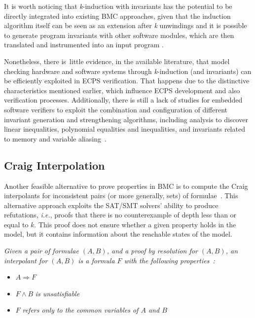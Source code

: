 \documentclass[format=acmsmall, review=false, screen=true]{acmart}
\begin{document}
It is worth noticing that \textit{k}-induction with invariants has the potential to be directly integrated into existing BMC approaches, given that the induction algorithm itself can be seen as an extension after \textit{k} unwindings and it is possible to generate program invariants with other software modules, which are then translated and instrumented into an input program \cite{Rocha15}.

Nonetheless, there is~little evidence, in the available literature, that model checking hardware and software systems through \textit{k}-induction (and invariants) can be efficiently exploited in ECPS verification. That happens due to the distinctive characteristics mentioned earlier, which influence ECPS development and also verification processes. Additionally, there is still a lack of studies for embedded software verifiers to exploit the combination and configuration of different invariant generation and strengthening algorithms, including analysis to discover linear inequalities, polynomial equalities and inequalities, and invariants related to memory and variable aliasing~\cite{Bradley07}.

\subsection{Craig Interpolation}
\label{sec:CraigInterpolationInModelChecking}

Another feasible alternative to prove properties in BMC is to compute the Craig interpolants for inconsistent pairs (or more generally, sets) of formulae~\cite{McMillan03,McMillan05,McMillan06,McMillan07}. This alternative approach exploits the SAT/SMT solvers' ability to produce refutations, {\it i.e.}, proofs that there is no counterexample of depth less than or equal to $k$. This proof does not ensure whether a given property holds in the model, but it contains information about the reachable states of the model.

\begin{definition}\label{interpolants}
\textit{Given a pair of formulae $\left(A,B\right)$, and a proof by resolution for $\left(A,B\right)$, an \textit{interpolant} for $\left(A,B\right)$ is a formula $F$ with the following properties~\cite{McMillan03,McMillan05}: }

\begin{itemize}
	\item $A \Rightarrow F$
	\item $F \wedge B$ \textit{is unsatisfiable}
	\item $F$ \textit{refers only to the common variables of $A$ and $B$}
\end{itemize}
\end{definition}
\end{document}

